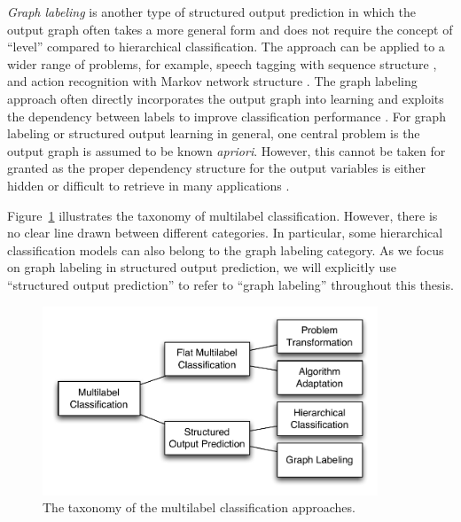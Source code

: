 \textit{Graph labeling} is another type of structured output prediction in which the output graph often takes a more general form and does not require the concept of ``level'' compared to hierarchical classification.
The approach can be applied to a wider range of problems, for example, speech tagging with sequence structure \citep{collins02a}, and action recognition with Markov network structure \citep{Wang11hidden}. 
The graph labeling approach often directly incorporates the output graph into learning and exploits the dependency between labels to improve classification performance \citep{collins02a,lafferty01,taskar02,Taskar04max,THJA04,Rousu07}.
For graph labeling or structured output learning in general, one central problem is the output graph is assumed to be known \textit{apriori}.
However, this cannot be taken for granted as the proper dependency structure for the output variables is either hidden or difficult to retrieve in many applications \citep{Chickering94learning}.

Figure~\ref{multilabel_taxonomy} illustrates the taxonomy of multilabel classification.
However, there is no clear line drawn between different categories.
In particular, some hierarchical classification models \citep{THJA04,Rousu06} can also belong to the graph labeling category.
As we focus on graph labeling in structured output prediction, we will explicitly use ``structured output prediction'' to refer to ``graph labeling'' throughout this thesis.

\begin{figure}
\begin{center}
	\centering
	\includegraphics[width=10cm]{./taxonomy.pdf}
	\caption{The taxonomy of the multilabel classification approaches.}
	\label{multilabel_taxonomy}
\end{center}
\end{figure}

